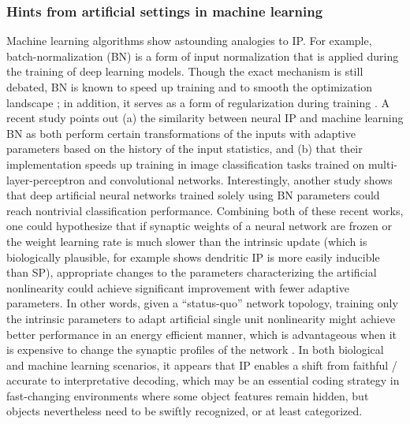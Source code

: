 \subsubsection*{Hints from artificial settings in machine learning}

Machine learning algorithms show astounding analogies to IP.
    For example, batch-normalization (BN) is a form of input normalization
        that is applied during the training of deep learning models.
    Though the exact mechanism is still debated, BN is known to speed up training
            and to smooth the optimization landscape \citep{Ioffe2015-bw,Santurkar2018-ff};
        in addition, it serves as a form of regularization during training \citep{Luo2018-vw}.
    A recent study \citep{Shaw2020-hu} points out
        (a) the similarity between neural IP and machine learning BN
            as both perform certain transformations of the inputs
            with adaptive parameters based on the history of the input statistics,
        and (b) that their implementation speeds up training
            in image classification tasks
            trained on multi-layer-perceptron and convolutional networks.
    Interestingly, another study \citep{Frankle2020-qs} shows that
        deep artificial neural networks trained solely using BN parameters
        could reach nontrivial classification performance.
    Combining both of these recent works, one could hypothesize that
        if synaptic weights of a neural network are frozen
            or the weight learning rate is much slower than the intrinsic update
            (which is biologically plausible, for example
                \cite{Lopez-Rojas2016-ew} shows dendritic IP is more easily inducible than SP),
        appropriate changes to the parameters characterizing the artificial nonlinearity
            could achieve significant improvement with fewer adaptive parameters.
    In other words, given a ``status-quo'' network topology,
        training only the intrinsic parameters to adapt artificial single unit nonlinearity
        might achieve better performance in an energy efficient manner,
            which is advantageous when it is expensive to change the synaptic profiles of the network \citep{Gallistel2017-em}.
    In both biological and machine learning scenarios, it appears that
        IP enables a shift from faithful / accurate to interpretative decoding,
            which may be an essential coding strategy in fast-changing environments
                where some object features remain hidden,
        but objects nevertheless need to be swiftly recognized, or at least categorized.

